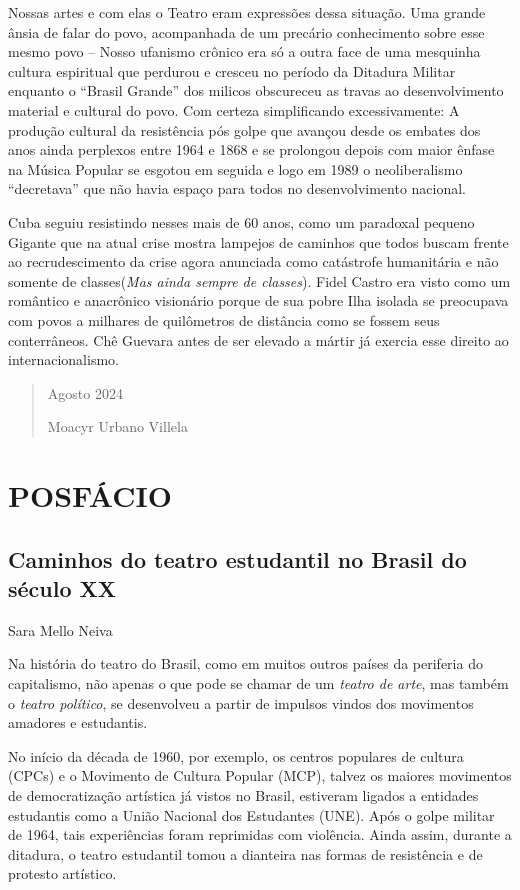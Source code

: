 Nossas artes e com elas o Teatro eram expressões dessa situação. Uma
grande ânsia de falar do povo, acompanhada de um precário conhecimento
sobre esse mesmo povo -- Nosso ufanismo crônico era só a outra face de
uma mesquinha cultura espiritual que perdurou e cresceu no período da
Ditadura Militar enquanto o “Brasil Grande” dos milicos obscureceu as
travas ao desenvolvimento material e cultural do povo. Com certeza
simplificando excessivamente: A produção cultural da resistência pós
golpe que avançou desde os embates dos anos ainda perplexos entre 1964 e
1868 e se prolongou depois com maior ênfase na Música Popular se esgotou
em seguida e logo em 1989 o neoliberalismo “decretava” que não havia
espaço para todos no desenvolvimento nacional.

Cuba seguiu resistindo nesses mais de 60 anos, como um paradoxal pequeno
Gigante que na atual crise mostra lampejos de caminhos que todos buscam
frente ao recrudescimento da crise agora anunciada como catástrofe
humanitária e não somente de classes(\textit{Mas ainda sempre de classes}).
Fidel Castro era visto como um romântico e anacrônico visionário porque
de sua pobre Ilha isolada se preocupava com povos a milhares de
quilômetros de distância como se fossem seus conterrâneos. Chê Guevara
antes de ser elevado a mártir já exercia esse direito ao
internacionalismo.

\begin{quote}
Agosto 2024

Moacyr Urbano Villela
\end{quote}

\chapter{POSFÁCIO}

\section{Caminhos do teatro estudantil no Brasil do século XX}

Sara Mello Neiva

Na história do teatro do Brasil, como em muitos outros países da
periferia do capitalismo, não apenas o que pode se chamar de um
\textit{teatro de arte}, mas também o \textit{teatro político}, se desenvolveu
a partir de impulsos vindos dos movimentos amadores e estudantis.

No início da década de 1960, por exemplo, os centros populares de
cultura (CPCs) e o Movimento de Cultura Popular (MCP), talvez os maiores
movimentos de democratização artística já vistos no Brasil, estiveram
ligados a entidades estudantis como a União Nacional dos Estudantes
(UNE). Após o golpe militar de 1964, tais experiências foram reprimidas
com violência. Ainda assim, durante a ditadura, o teatro estudantil
tomou a dianteira nas formas de resistência e de protesto artístico.

